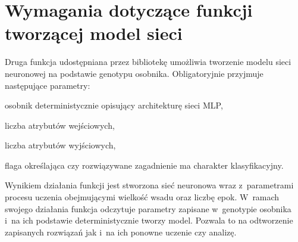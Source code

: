 \section{%
  Wymagania dotyczące funkcji
  tworzącej model sieci%
}
Druga funkcja udostępniana przez bibliotekę
umożliwia tworzenie modelu sieci neuronowej
na podstawie genotypu osobnika.
Obligatoryjnie przyjmuje następujące parametry:
\begin{nospitemize}
  \item osobnik deterministycznie
    opisujący architekturę sieci \gls{MLP},
  \item liczba atrybutów wejściowych,
  \item liczba atrybutów wyjściowych,
  \item flaga określająca czy rozwiązywane
    zagadnienie ma charakter klasyfikacyjny.
\end{nospitemize}

Wynikiem działania funkcji jest stworzona sieć neuronowa
wraz z~parametrami procesu uczenia obejmującymi
wielkość wsadu oraz liczbę epok.
W~ramach swojego działania funkcja odczytuje
parametry zapisane w~genotypie osobnika
i~na ich podstawie deterministycznie tworzy model.
Pozwala to na odtworzenie zapisanych rozwiązań jak
i~na ich ponowne uczenie czy analizę.
